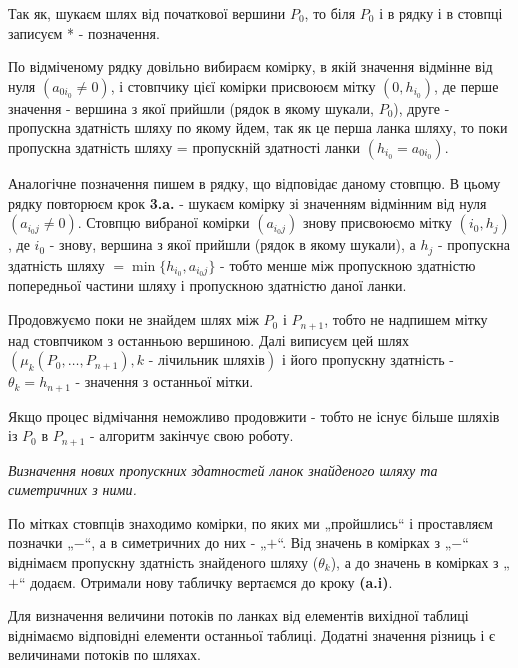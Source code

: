 \documentclass[12pt,a4paper]{report}
\newenvironment{slim_enumerate}{
\begin{enumerate}
  \setlength{\itemsep}{1pt}
  \setlength{\parskip}{0pt}
  \setlength{\parsep}{0pt}}
{\end{enumerate}}
\begin{document}
\begin{slim_enumerate}
\begin{slim_enumerate}
Так як, шукаєм шлях від початкової вершини $P_0$, то біля $P_0$ і в рядку і в стовпці записуєм * - позначення.
    \begin{slim_enumerate}
      \item По відміченому рядку довільно вибираєм комірку, в якій значення відмінне від нуля $(a_{0 i_0} \neq 0)$, і стовпчику цієї комірки присвоюєм мітку $(0, h_{i_0})$, де перше значення - вершина з якої прийшли (рядок в якому шукали, $P_0$), друге - пропускна здатність шляху по якому йдем, так як це перша ланка шляху, то поки пропускна здатність шляху = пропускній здатності ланки $(h_{i_0}=a_{0 i_0})$.
      \item Аналогічне позначення пишем в рядку, що відповідає даному стовпцю. В цьому рядку повторюєм крок {\bf 3.a.} - шукаєм комірку зі значенням відмінним від нуля $(a_{i_0 j} \neq 0)$. Стовпцю вибраної комірки $(a_{i_0 j})$ знову присвоюємо мітку $(i_0, h_j)$, де $i_0$ - знову, вершина з якої прийшли (рядок в якому шукали), а $h_j$ - пропускна здатність шляху $= \min \{h_{i_0}, a_{i_0 j}\}$ - тобто менше між пропускною здатністю попередньої частини шляху і пропускною здатністю даної ланки.
      \item Продовжуємо поки не знайдем шлях між $P_0$ і $P_{n+1}$, тобто не надпишем мітку над стовпчиком з останньою вершиною. Далі виписуєм цей шлях $(\mu_k(P_0, \dots , P_{n+1}), k \mbox{ - лічильник шляхів})$ і його пропускну здатність - $\theta_k=h_{n+1}$ - значення з останньої мітки.

Якщо процес відмічання неможливо продовжити - тобто не існує більше шляхів із $P_0$ в $P_{n+1}$ - алгоритм закінчує свою роботу.
    \end{slim_enumerate}
  \item {\it Визначення нових пропускних здатностей ланок знайденого шляху та симетричних з ними.}

По мітках стовпців знаходимо комірки, по яких ми „пройшлись“ і проставляєм позначки „$-$“, а в симетричних до них - „$+$“. Від значень в комірках з „$-$“ віднімаєм пропускну здатність знайденого шляху ($\theta_k$), а до значень в комірках з „$+$“ додаєм. Отримали нову табличку вертаємся до кроку {\bf (a.i)}.
  \end{slim_enumerate}
\end{slim_enumerate}

Для визначення величини потоків по ланках від елементів вихідної таблиці віднімаємо відповідні елементи останньої таблиці. Додатні значення різниць і є величинами потоків по шляхах.
\end{document}
